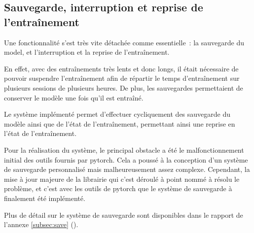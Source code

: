 \subsection{Sauvegarde, interruption et reprise de l'entraînement}\label{subsec:gmsnn_save}
Une fonctionnalité s'est très vite détachée comme essentielle~: la sauvegarde du \gls{model}, et l'interruption et la reprise de l'entraînement.

En effet, avec des entraînements très lents et donc longs, il était nécessaire de pouvoir suspendre l'entraînement afin de répartir le temps d'entraînement sur plusieurs sessions de plusieurs heures. De plus, les sauvegardes permettaient de conserver le modèle une fois qu'il est entraîné.

Le système implémenté permet d'effectuer cycliquement des sauvegarde du modèle ainsi que de l'état de l'entraînement, permettant ainsi une reprise en l'état de l'entraînement.

Pour la réalisation du système, le principal obstacle a été le malfonctionnement initial des outils fournis par \gls{pytorch}.
Cela a poussé à la conception d'un système de sauvegarde personnalisé mais malheureusement assez complexe.
Cependant, la mise à jour majeure de la librairie qui c'est déroulé à point nommé à résolu le problème, et c'est avec les outils de \gls{pytorch} que le système de sauvegarde à finalement été implémenté.

Plus de détail sur le système de sauvegarde sont disponibles dans le rapport de l'annexe \ref{subsec:save} ().